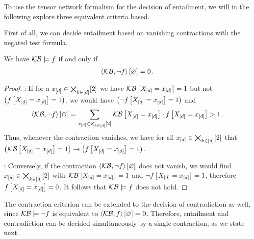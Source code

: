 To use the tensor network formalism for the decision of entailment, we will in the following explore three equivalent criteria based.


First of all, we can decide entailment based on vanishing contractions with the negated test formula.

\begin{theorem}\label{the:contCriterionLogEntailment}
	We have $\mathcal{KB}\models f$ if and only if
	\begin{align*}
		\left\langle \mathcal{KB},\lnot f\right\rangle \left[ \varnothing \right] = 0 \, .
	\end{align*}
\end{theorem}
\begin{proof}
	\proofleftsymbol:
	If for a $x_{[d]}\in\bigtimes_{k\in[d]}[2]$ we have $\mathcal{KB}\left[X_{[d]}=x_{[d]}\right]=1$ but not $\big(f\left[X_{[d]}=x_{[d]}\right]=1\big)$, we would have $\big(\lnot f\left[X_{[d]}=x_{[d]}\right]=1\big)$ and
	\begin{align*}
		\left\langle \mathcal{KB},\lnot f\right\rangle \left[ \varnothing \right] =
		\sum_{x_{[d]}\in\bigtimes_{k\in[d]}[2]} \mathcal{KB}\left[X_{[d]}=x_{[d]}\right] \cdot f\left[X_{[d]}=x_{[d]}\right] > 1 \, .
	\end{align*}
	Thus, whenever the contraction vanishes, we have for all $x_{[d]}\in\bigtimes_{k\in[d]}[2]$ that $\big(\mathcal{KB}\left[X_{[d]}=x_{[d]}\right]=1\big) \rightarrow \big(f\left[X_{[d]}=x_{[d]}\right]=1\big)$.

	\proofrightsymbol:
	Conversely, if the contraction $\left\langle \mathcal{KB},\lnot f\right\rangle \left[ \varnothing \right]$ does not vanish, we would find $x_{[d]}\in\bigtimes_{k\in[d]}[2]$ with $\mathcal{KB}\left[X_{[d]}=x_{[d]}\right]=1$ and $\lnot f\left[X_{[d]}=x_{[d]}\right]=1$, therefore $f\left[X_{[d]}=x_{[d]}\right]=0$.
	It follows that $\mathcal{KB}\models f$ does not hold.
\end{proof}


The contraction criterion can be extended to the decision of contradiction as well, since $\mathcal{KB}\models\lnot f$ is equivalent to $\left\langle \mathcal{KB},f\right\rangle \left[ \varnothing \right]=0$.
Therefore, entailment and contradiction can be decided simultaneously by a single contraction, as we state next.


